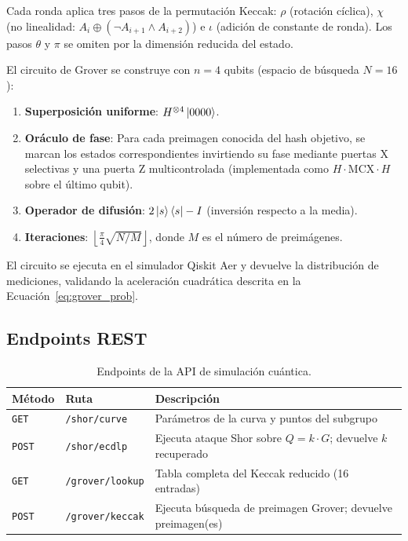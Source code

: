 Cada ronda aplica tres pasos de la permutación Keccak: $\rho$ (rotación cíclica), $\chi$ (no linealidad: $A_i \oplus (\neg A_{i+1} \wedge A_{i+2})$) e $\iota$ (adición de constante de ronda). Los pasos $\theta$ y $\pi$ se omiten por la dimensión reducida del estado.

El circuito de Grover se construye con $n = 4$ qubits (espacio de búsqueda $N = 16$):

\begin{enumerate}
  \item \textbf{Superposición uniforme}: $H^{\otimes 4}\ket{0000}$.
  \item \textbf{Oráculo de fase}: Para cada preimagen conocida del hash objetivo, se marcan los estados correspondientes invirtiendo su fase mediante puertas X selectivas y una puerta Z multicontrolada (implementada como $H \cdot \text{MCX} \cdot H$ sobre el último qubit).
  \item \textbf{Operador de difusión}: $2\ket{s}\bra{s} - I$ (inversión respecto a la media).
  \item \textbf{Iteraciones}: $\left\lfloor \frac{\pi}{4}\sqrt{N/M} \right\rfloor$, donde $M$ es el número de preimágenes.
\end{enumerate}

El circuito se ejecuta en el simulador Qiskit Aer y devuelve la distribución de mediciones, validando la aceleración cuadrática descrita en la Ecuación~\ref{eq:grover_prob}.

\subsection{Endpoints REST}

\begin{table}[htbp]
\centering
\caption{Endpoints de la API de simulación cuántica.}
\label{tab:qiskit_endpoints}
\begin{tabular}{@{}llL{7cm}@{}}
\toprule
\textbf{Método} & \textbf{Ruta} & \textbf{Descripción} \\
\midrule
\texttt{GET} & \texttt{/shor/curve} & Parámetros de la curva y puntos del subgrupo \\
\texttt{POST} & \texttt{/shor/ecdlp} & Ejecuta ataque Shor sobre $Q = k \cdot G$; devuelve $k$ recuperado \\
\texttt{GET} & \texttt{/grover/lookup} & Tabla completa del Keccak reducido (16 entradas) \\
\texttt{POST} & \texttt{/grover/keccak} & Ejecuta búsqueda de preimagen Grover; devuelve preimagen(es) \\
\bottomrule
\end{tabular}
\end{table}


